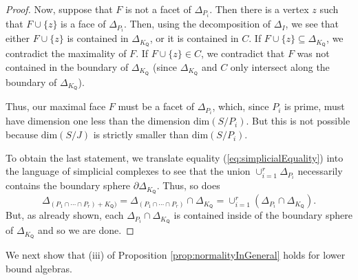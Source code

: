 \documentclass[10pt]{amsart}
\numberwithin{equation}{section}
\theoremstyle{definition}
\theoremstyle{remark}
\newcommand{\1}{^{-1}}
\def\Q{\mathsf{Q}}
\begin{document}
\begin{proof}



Now, suppose that $F$ is not a facet of $\Delta_{P_i}$. Then there is a vertex $z$ such that $F\cup\{z\}$ is a face of $\Delta_{P_i}$.
Then, using the decomposition of $\Delta_I$, we see that either $F\cup\{z\}$ is contained in $\Delta_{K_\Q}$, or it is contained in $C$. If $F\cup \{z\}\subseteq \Delta_{K_\Q}$, we contradict the maximality of $F$. If $F\cup\{z\}\in C$, we contradict that $F$ was not contained in the boundary of $\Delta_{K_\Q}$ (since $\Delta_{K_\Q}$ and $C$ only intersect along the boundary of $\Delta_{K_\Q}$).

Thus, our maximal face $F$ must be a facet of $\Delta_{P_i}$, which, since $P_i$ is prime, must have dimension one less than the dimension $\mathrm{dim}(S/P_i)$. But this is not possible because $\mathrm{dim}(S/J)$ is strictly smaller than $\mathrm{dim}(S/P_i)$.

To obtain the last statement, we translate equality (\ref{eq:simplicialEquality}) into the language of simplicial complexes to see that the union $\cup_{i=1}^r \Delta_{P_i}$ necessarily contains the boundary sphere $\partial \Delta_{K_\Q}$. Thus, so does 
\[\Delta_{(P_1\cap\cdots \cap P_r)+K_\Q)} = \Delta_{(P_1\cap\cdots\cap P_r)}\cap \Delta_{K_\Q} = \cup_{i=1}^r (\Delta_{P_i}\cap \Delta_{K_\Q}). \]
But, as already shown, each $\Delta_{P_i}\cap \Delta_{K_\Q}$ is contained inside of the boundary sphere of $\Delta_{K_\Q}$ and so we are done.
\end{proof}

We next show that (iii) of Proposition \ref{prop:normalityInGeneral} holds for lower bound algebras.
\end{document}
